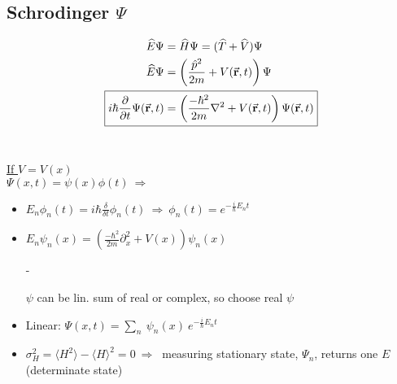 \documentclass[12pt]{article}
\begin{document}
\subsection{Schrodinger \( \Psi \)}
\unskip
\[ \begin{aligned}
    \widehat{E} \Psi &= \widehat{H} \Psi = ( \widehat{T} + \widehat{V} ) \Psi\\
    \widehat{E} \Psi 
        &= \left( \frac{ \hat{p}^2 }{2m} + V(\vec{\mathbf{r}},t) \right) \Psi\\
    \Aboxed{ i \hbar \frac{\partial}{\partial t} \Psi(\vec{\mathbf{r}},t) 
        &= \left( \frac{-\hbar^2}{2m} \nabla^2 
            + V(\vec{\mathbf{r}},t) \right) \Psi(\vec{\mathbf{r}},t) }
\end{aligned} \]\\[5pt]
\begin{minipage}[t]{.49\textwidth}
    \underline{If \(V=V(x)\)}\\[10pt]
    \(\Psi(x,t) = \psi(x)\phi(t) \ \Rightarrow\)
    \begin{itemize}
        \item \( E_n \phi_n(t) = i \hbar \frac{\delta}{\delta t} \phi_n(t) \ \Rightarrow \ 
            \boxed{ \phi_n(t) = e^{- \frac{i}{\hbar} E_n t} } \)\\
        \item \( \boxed{ E_n \psi_n(x) 
            = \left( \frac{-\hbar^2}{2m} \partial_x^2 + V(x) \right) \psi_n(x) } \)\\
        \item[-] \begin{itemize}
                \(\psi\) can be lin. sum of real or complex, so choose real \(\psi\)
            \end{itemize}
        \item Linear: \( \boxed{ \Psi(x,t) 
            = \sum_n \ \psi_n(x) \ e^{- \frac{i}{\hbar} E_n t} } \)\\
        \item \(\sigma^2_H = \langle H^2\rangle - \langle H \rangle^2  = 0
            \ \Rightarrow \ \) measuring stationary state, \(\Psi_n\), returns one \(E\) 
            (determinate state)
    \end{itemize}
\end{minipage}
\hspace{10pt}
\end{document}
